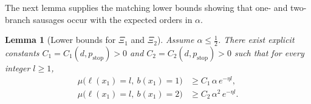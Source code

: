 \documentclass[letterpaper,11pt,reqno]{amsart}
\newtheorem{lemma}[thm]{Lemma}
\theoremstyle{definition}
\begin{document}
The next lemma supplies the matching lower bounds showing that one- and two-branch sausages occur with the expected orders in \(\alpha\).


\begin{lemma}[Lower bounds for $\Xi_1$ and $\Xi_2$]\label{lem:X1X2-lower-bound}
Assume $\alpha\le \tfrac12$.
There exist explicit constants $C_1=C_1(d,p_{\mathrm{stop}})>0$ and $C_2=C_2(d,p_{\mathrm{stop}})>0$ such that
for every integer $l\ge1$,
\begin{align}
\mu\big(\ell(x_1)=l,\ b(x_1)=1\big) &\ge C_1\,\alpha\,e^{-\eta l}, \label{eq:Xi-1-lower}\\
\mu\big(\ell(x_1)=l,\ b(x_1)=2\big) &\ge C_2\,\alpha^2\,e^{-\eta l}. \label{eq:Xi-2-lower}
\end{align}
\end{lemma}
\end{document}
